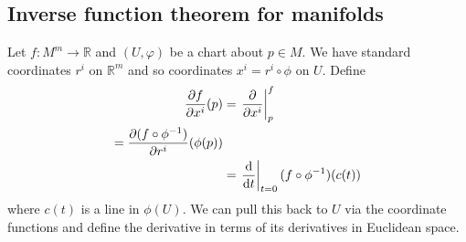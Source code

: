 \subsection{Inverse function theorem for manifolds}
Let $f : M^m \to \mathbb{R}$ and $(U, \varphi)$ be a chart about
$p \in M$. We have standard coordinates $r^i$ on $\mathbb{R}^m$
and so coordinates $x^i = r^i \circ \phi$ on $U$. Define
\begin{align*}
   \frac{\partial f}{\partial x^i}(p)
&= \left.\frac{\partial}{\partial x^i}\right|^f_p \\
 = \frac{\partial (f \circ \phi^{-1})}{\partial r^i}(\phi(p)) \\
&= \left.\frac{\mathop{}\!\mathrm{d}}{\mathop{}\!\mathrm{d} t}\right|_{t = 0} (f \circ \phi^{-1})(c(t))
\end{align*}
where $c(t)$ is a line in $\phi(U)$. We can pull this back to $U$ via the
coordinate functions and define the derivative in terms of its
derivatives in Euclidean space.
